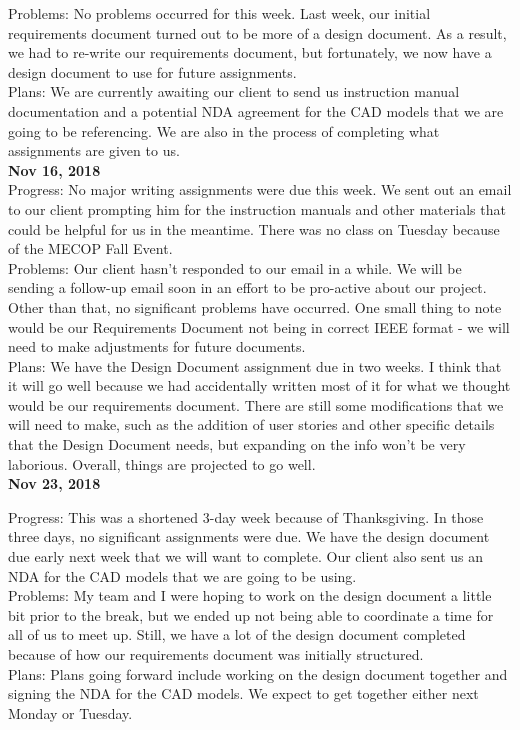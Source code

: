 Problems: 	No problems occurred for this week. Last week, our initial requirements document turned out to be more of a design document. As a result, we had to re-write our requirements document, but fortunately, we now have a design document to use for future assignments.\\
Plans: 	We are currently awaiting our client to send us instruction manual documentation and a potential NDA agreement for the CAD models that we are going to be referencing. We are also in the process of completing what assignments are given to us. \\

\textbf{Nov 16, 2018}\\

Progress: 	No major writing assignments were due this week. We sent out an email to our client prompting him for the instruction manuals and other materials that could be helpful for us in the meantime. There was no class on Tuesday because of the MECOP Fall Event. \\
Problems: 	Our client hasn't responded to our email in a while. We will be sending a follow-up email soon in an effort to be pro-active about our project. Other than that, no significant problems have occurred. One small thing to note would be our Requirements Document not being in correct IEEE format - we will need to make adjustments for future documents.\\
Plans: 	We have the Design Document assignment due in two weeks. I think that it will go well because we had accidentally written most of it for what we thought would be our requirements document. There are still some modifications that we will need to make, such as the addition of user stories and other specific details that the Design Document needs, but expanding on the info won't be very laborious. Overall, things are projected to go well.\\

\textbf{Nov 23, 2018}

Progress: 	This was a shortened 3-day week because of Thanksgiving. In those three days, no significant assignments were due. We have the design document due early next week that we will want to complete. Our client also sent us an NDA for the CAD models that we are going to be using. \\
Problems: 	My team and I were hoping to work on the design document a little bit prior to the break, but we ended up not being able to coordinate a time for all of us to meet up. Still, we have a lot of the design document completed because of how our requirements document was initially structured.\\
Plans: 	Plans going forward include working on the design document together and signing the NDA for the CAD models. We expect to get together either next Monday or Tuesday. \\

